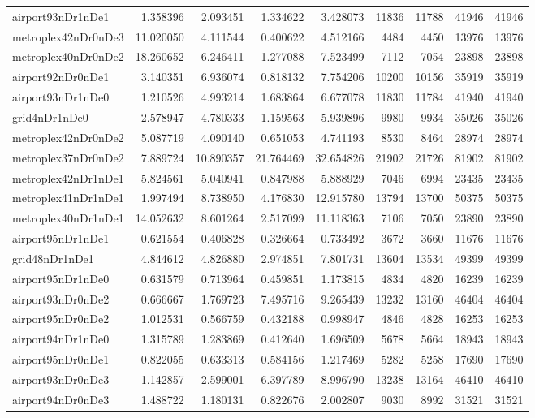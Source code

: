 \begin{longtable}{|l|r|r|r|r|r|r|r|r|}
airport93nDr1nDe1 & 1.358396 & 2.093451 & 1.334622 & 3.428073 & 11836 & 11788 & 41946 & 41946 \\
metroplex42nDr0nDe3 & 11.020050 & 4.111544 & 0.400622 & 4.512166 & 4484 & 4450 & 13976 & 13976 \\
metroplex40nDr0nDe2 & 18.260652 & 6.246411 & 1.277088 & 7.523499 & 7112 & 7054 & 23898 & 23898 \\
airport92nDr0nDe1 & 3.140351 & 6.936074 & 0.818132 & 7.754206 & 10200 & 10156 & 35919 & 35919 \\
airport93nDr1nDe0 & 1.210526 & 4.993214 & 1.683864 & 6.677078 & 11830 & 11784 & 41940 & 41940 \\
grid4nDr1nDe0 & 2.578947 & 4.780333 & 1.159563 & 5.939896 & 9980 & 9934 & 35026 & 35026 \\
metroplex42nDr0nDe2 & 5.087719 & 4.090140 & 0.651053 & 4.741193 & 8530 & 8464 & 28974 & 28974 \\
metroplex37nDr0nDe2 & 7.889724 & 10.890357 & 21.764469 & 32.654826 & 21902 & 21726 & 81902 & 81902 \\
metroplex42nDr1nDe1 & 5.824561 & 5.040941 & 0.847988 & 5.888929 & 7046 & 6994 & 23435 & 23435 \\
metroplex41nDr1nDe1 & 1.997494 & 8.738950 & 4.176830 & 12.915780 & 13794 & 13700 & 50375 & 50375 \\
metroplex40nDr1nDe1 & 14.052632 & 8.601264 & 2.517099 & 11.118363 & 7106 & 7050 & 23890 & 23890 \\
airport95nDr1nDe1 & 0.621554 & 0.406828 & 0.326664 & 0.733492 & 3672 & 3660 & 11676 & 11676 \\
grid48nDr1nDe1 & 4.844612 & 4.826880 & 2.974851 & 7.801731 & 13604 & 13534 & 49399 & 49399 \\
airport95nDr1nDe0 & 0.631579 & 0.713964 & 0.459851 & 1.173815 & 4834 & 4820 & 16239 & 16239 \\
airport93nDr0nDe2 & 0.666667 & 1.769723 & 7.495716 & 9.265439 & 13232 & 13160 & 46404 & 46404 \\
airport95nDr0nDe2 & 1.012531 & 0.566759 & 0.432188 & 0.998947 & 4846 & 4828 & 16253 & 16253 \\
airport94nDr1nDe0 & 1.315789 & 1.283869 & 0.412640 & 1.696509 & 5678 & 5664 & 18943 & 18943 \\
airport95nDr0nDe1 & 0.822055 & 0.633313 & 0.584156 & 1.217469 & 5282 & 5258 & 17690 & 17690 \\
airport93nDr0nDe3 & 1.142857 & 2.599001 & 6.397789 & 8.996790 & 13238 & 13164 & 46410 & 46410 \\
airport94nDr0nDe3 & 1.488722 & 1.180131 & 0.822676 & 2.002807 & 9030 & 8992 & 31521 & 31521 \\

\end{longtable}
